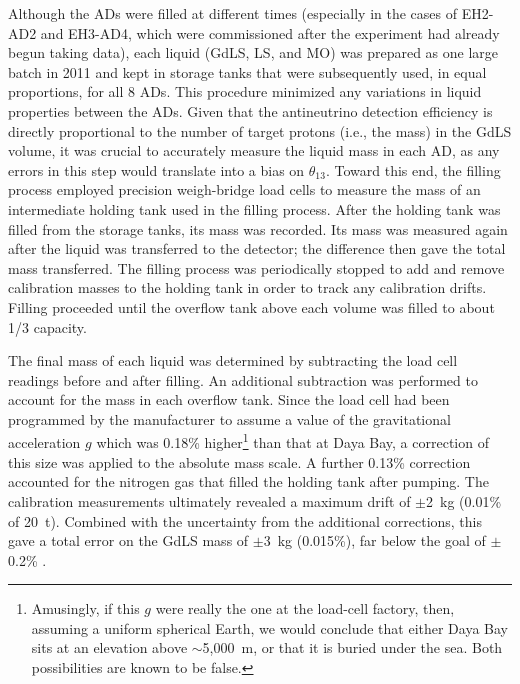 \documentclass[../thesis.tex]{subfiles}
\begin{document}
Although the ADs were filled at different times (especially in the cases of EH2-AD2 and EH3-AD4, which were commissioned after the experiment had already begun taking data), each liquid (GdLS, LS, and MO) was prepared as one large batch in 2011 and kept in storage tanks that were subsequently used, in equal proportions, for all 8 ADs. This procedure minimized any variations in liquid properties between the ADs. Given that the antineutrino detection efficiency is directly proportional to the number of target protons (i.e., the mass) in the GdLS volume, it was crucial to accurately measure the liquid mass in each AD, as any errors in this step would translate into a bias on $\theta_{13}$. Toward this end, the filling process employed precision weigh-bridge load cells to measure the mass of an intermediate holding tank used in the filling process. After the holding tank was filled from the storage tanks, its mass was recorded. Its mass was measured again after the liquid was transferred to the detector; the difference then gave the total mass transferred. The filling process was periodically stopped to add and remove calibration masses to the holding tank in order to track any calibration drifts. Filling proceeded until the overflow tank above each volume was filled to about 1/3 capacity.

The final mass of each liquid was determined by subtracting the load cell readings before and after filling. An additional subtraction was performed to account for the mass in each overflow tank. Since the load cell had been programmed by the manufacturer to assume a value of the gravitational acceleration $g$ which was 0.18\% higher\footnote{Amusingly, if this $g$ were really the one at the load-cell factory, then, assuming a uniform spherical Earth, we would conclude that either Daya Bay sits at an elevation above $\sim$5,000~m, or that it is buried under the sea. Both possibilities are known to be false.} than that at Daya Bay, a correction of this size was applied to the absolute mass scale. A further 0.13\% correction accounted for the nitrogen gas that filled the holding tank after pumping. The calibration measurements ultimately revealed a maximum drift of $\pm$2~kg (0.01\% of 20~t). Combined with the uncertainty from the additional corrections, this gave a total error on the GdLS mass of $\pm$3~kg (0.015\%), far below the goal of $\pm$0.2\% \cite{Band_2013}.
\end{document}
